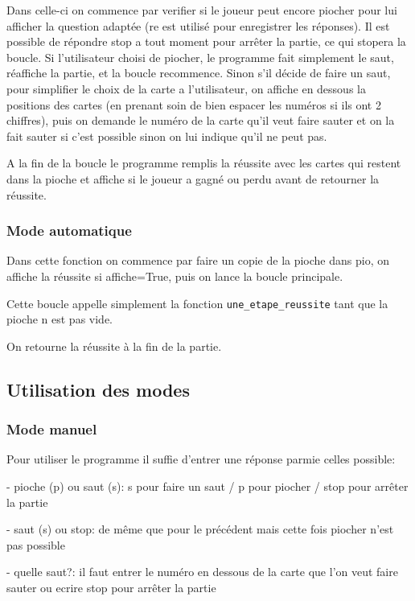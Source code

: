 \documentclass{scrartcl}
\newcommand{\ts}[1]{{\fontfamily{pcr}\selectfont #1}}
\begin{document}
Dans celle-ci on commence par verifier si le joueur peut encore piocher pour lui afficher la question adaptée (\ts{re} est utilisé pour enregistrer les réponses).
Il est possible de répondre \ts{stop} a tout moment pour arrêter la partie, ce qui stopera la boucle.
Si l'utilisateur choisi de piocher, le programme fait simplement le saut, réaffiche la partie, et la boucle recommence.
Sinon s'il décide de faire un saut, pour simplifier le choix de la carte a l'utilisateur, on affiche en dessous la positions des cartes (en prenant soin de bien espacer les numéros si ils ont 2 chiffres), puis on demande le numéro de la carte qu'il veut faire sauter et on la fait sauter si c'est possible sinon on lui indique qu'il ne peut pas.

A la fin de la boucle le programme remplis la réussite avec les cartes qui restent dans la pioche et affiche si le joueur a gagné ou perdu avant de retourner la réussite.

\subsubsection{Mode automatique}\label{subsec:mode_a}
Dans cette fonction on commence par faire un copie de la pioche dans \ts{pio}, on affiche la réussite si affiche=True, puis on lance la boucle principale.

Cette boucle appelle simplement la fonction {\selectfont \verb+une_etape_reussite+} tant que la pioche \ts{n} est pas vide.

On retourne la réussite à la fin de la partie.
 
\subsection{Utilisation des modes}

\subsubsection{Mode manuel}
Pour utiliser le programme il suffie d'entrer une réponse parmie celles possible:

- pioche (\ts{p}) ou saut (\ts{s}): \ts{s} pour faire un saut / \ts{p} pour piocher / \ts{stop} pour arrêter la partie

- saut (\ts{s}) ou \ts{stop}: de même que pour le précédent mais cette fois piocher n'est pas possible

- quelle saut?: il faut entrer le numéro en dessous de la carte que l'on veut faire sauter ou ecrire \ts{stop} pour arrêter la partie
\end{document}
